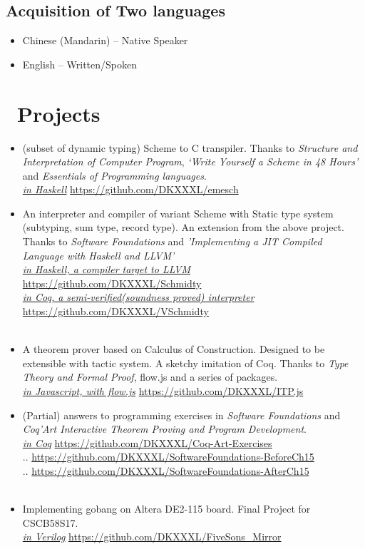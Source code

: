 \documentclass{resume}
\begin{document}
\subsection{\textbf{Acquisition of Two languages}}
\begin{itemize}
\item Chinese (Mandarin) – Native Speaker
\item English – Written/Spoken
\end{itemize}


\section{\faCogs\ Projects}
\begin{itemize}
\item (subset of dynamic typing) Scheme to C transpiler. Thanks to \textit{Structure and Interpretation of Computer Program}, \textit{‘Write Yourself a Scheme in 48 Hours’} and \textit{Essentials of Programming languages}. \\
\textit{\underline{in Haskell}} \hfill \url{https://github.com/DKXXXL/emesch}
\\
\item An interpreter and compiler of variant Scheme with Static type system (subtyping, sum type, record type). An extension from the above project. Thanks to \textit{Software Foundations} and \textit{'Implementing a JIT Compiled Language with Haskell and LLVM'} \\
\textit{\underline{in Haskell, a compiler target to LLVM}} \hfill \url{https://github.com/DKXXXL/Schmidty} \\
\textit{\underline{in Coq, a semi-verified(soundness proved) interpreter}} \hfill \url{https://github.com/DKXXXL/VSchmidty} \\
\\
\item A theorem prover based on Calculus of Construction. Designed to be extensible with tactic system. A sketchy imitation of Coq. Thanks to \textit{Type Theory and Formal Proof}, flow.js and a series of packages.\\
\textit{\underline{in Javascript, with flow.js}} \hfill \url{https://github.com/DKXXXL/ITP.js}
\\
\item (Partial) answers to programming exercises in \textit{Software Foundations} and \textit{Coq’Art Interactive Theorem Proving and Program Development}. \\
\textit{\underline{in Coq}} \hfill \url{https://github.com/DKXXXL/Coq-Art-Exercises} \\
..  \hfill \url{https://github.com/DKXXXL/SoftwareFoundations-BeforeCh15} \\
..  \hfill \url{https://github.com/DKXXXL/SoftwareFoundations-AfterCh15} \\
\\
\item Implementing gobang on Altera DE2-115 board. Final Project for CSCB58S17. \\
\textit{\underline{in Verilog}} 
\hfill \url{https://github.com/DKXXXL/FiveSons\_Mirror}

\end{itemize}
\end{document}
